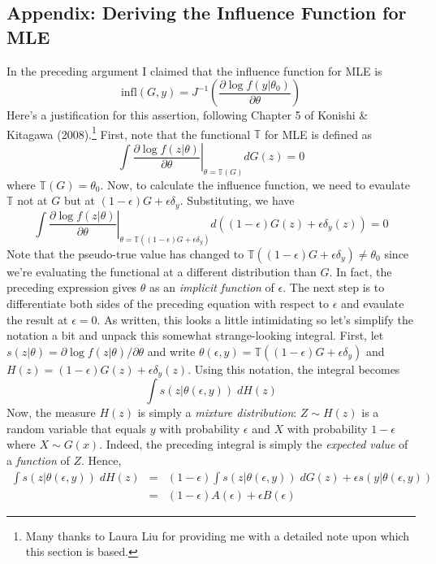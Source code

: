 \documentclass[12pt]{article}
\theoremstyle{definition}
\begin{document}
\subsection*{Appendix: Deriving the Influence Function for MLE}
In the preceding argument I claimed that the influence function for MLE is 
	$$\mbox{infl}(G,y) = J^{-1} \left(\frac{\partial \log f(y|\theta_0)}{\partial \theta}\right)$$
Here's a justification for this assertion, following Chapter 5 of Konishi \& Kitagawa (2008).\footnote{Many thanks to Laura Liu for providing me with a detailed note upon which this section is based.} First, note that the functional $\mathbb{T}$ for MLE is defined as
$$\int\left.\frac{\partial\log f\left(z|\theta\right)}{\partial\theta}\right|_{\theta=\mathbb{T}\left(G\right)}dG\left(z\right)=0$$
where $\mathbb{T}\left(G\right)=\theta_{0}$. Now, to calculate the influence function, we need to evaulate $\mathbb{T}$ not at $G$ but at $\left(1-\epsilon\right)G+\epsilon\delta_{y}$. Substituting, we have
$$\int\left.\frac{\partial\log f\left(z|\theta\right)}{\partial\theta}\right|_{\theta=\mathbb{T}\left(\left(1-\epsilon\right)G+\epsilon\delta_{y}\right)}d\left(\left(1-\epsilon\right)G\left(z\right)+\epsilon\delta_{y}\left(z\right)\right)=0$$
Note that the pseudo-true value has changed to $\mathbb{T}(\left(1-\epsilon\right)G+\epsilon\delta_{y}) \neq \theta_0$ since we're evaluating the functional at a different distribution than $G$. In fact, the preceding expression gives $\theta$ as an \emph{implicit function} of $\epsilon$. The next step is to differentiate both sides of the preceding equation with respect to $\epsilon$ and evaulate the result at $\epsilon = 0$. As written, this looks a little intimidating so let's simplify the notation a bit and unpack this somewhat strange-looking integral. First, let $s(z| \theta) = \partial \log f(z|\theta)/\partial \theta$ and write $\theta(\epsilon,y) = \mathbb{T}(\left(1-\epsilon\right)G+\epsilon\delta_{y})$ and $H(z) = \left(1-\epsilon\right)G\left(z\right)+\epsilon\delta_{y}\left(z\right)$. Using this notation, the integral becomes
	$$\int s(z|\theta(\epsilon,y))\; dH(z)$$
Now, the measure $H(z)$ is simply a \emph{mixture distribution}: $Z \sim H(z)$ is a random variable that equals $y$ with probability $\epsilon$ and $X$ with probability $1-\epsilon$ where $X \sim G(x)$. Indeed, the preceding integral is simply the \emph{expected value} of a \emph{function} of $Z$. Hence,
\begin{eqnarray*}
	\int s(z|\theta(\epsilon,y))\; dH(z) &=& (1-\epsilon)\int s(z|\theta(\epsilon,y))\; dG(z) + \epsilon s(y|\theta(\epsilon,y))\\
		&=& (1-\epsilon) A(\epsilon) + \epsilon B(\epsilon)
\end{eqnarray*}
\end{document}
